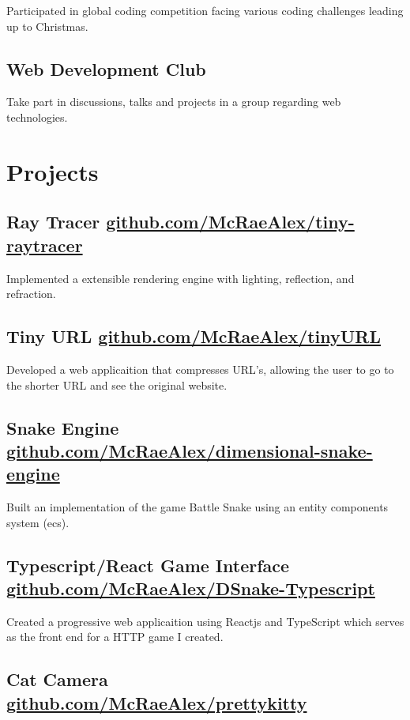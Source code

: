 \documentclass{article}
\begin{document}
Participated in global coding competition facing various coding challenges
leading up to Christmas.

\subsection{Web Development Club}

Take part in discussions, talks and projects in a group regarding web 
technologies.

\section{Projects}

\subsection{Ray Tracer \href{https://github.com/McRaeAlex/tiny-raytracer}{github.com/McRaeAlex/tiny-raytracer}}

Implemented a extensible rendering engine with lighting, reflection, and 
refraction.

\subsection{Tiny URL \href{https://github.com/McRaeAlex/tinyURL}{github.com/McRaeAlex/tinyURL}}

Developed a web applicaition that compresses URL's, allowing the user to go to 
the shorter URL and see the original website.

\subsection{Snake Engine \href{https://github.com/McRaeAlex/dimensional-snake-engine}{github.com/McRaeAlex/dimensional-snake-engine}}

Built an implementation of the game Battle Snake using an entity components
system (ecs).

\subsection{Typescript/React Game Interface \href{https://github.com/McRaeAlex/DSnake-Typescript}{github.com/McRaeAlex/DSnake-Typescript}}

Created a progressive web applicaition using Reactjs and TypeScript which serves
as the front end for a HTTP game I created.

\subsection{Cat Camera \href{https://github.com/McRaeAlex/prettykitty}{github.com/McRaeAlex/prettykitty}}
\end{document}
